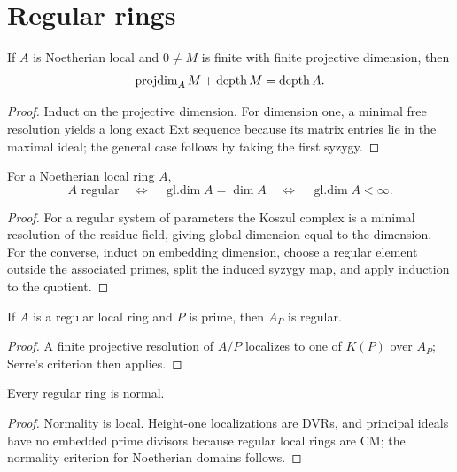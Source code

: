 \section{Regular rings}
\begin{theorem}\label{mcrt-thm-19-1}
If $A$ is Noetherian local and $0\ne M$ is finite with finite projective
dimension, then
\[
\operatorname{projdim}_A M+\operatorname{depth} M=\operatorname{depth} A.
\]
\end{theorem}
\begin{proof}
Induct on the projective dimension.  For dimension one, a minimal free
resolution yields a long exact Ext sequence because its matrix entries lie in
the maximal ideal; the general case follows by taking the first syzygy.
\end{proof}

\begin{theorem}\label{mcrt-thm-19-2}
For a Noetherian local ring $A$,
\[
A\text{ regular}\quad\Longleftrightarrow\quad
\operatorname{gl.dim}A=\dim A\quad\Longleftrightarrow\quad
\operatorname{gl.dim}A<\infty.
\]
\end{theorem}
\begin{proof}
For a regular system of parameters the Koszul complex is a minimal resolution
of the residue field, giving global dimension equal to the dimension.  For the
converse, induct on embedding dimension, choose a regular element outside the
associated primes, split the induced syzygy map, and apply induction to the
quotient.
\end{proof}

\begin{theorem}\label{mcrt-thm-19-3}
If $A$ is a regular local ring and $P$ is prime, then $A_P$ is regular.
\end{theorem}
\begin{proof}
A finite projective resolution of $A/P$ localizes to one of $K(P)$ over $A_P$;
Serre's criterion then applies.
\end{proof}

\begin{theorem}\label{mcrt-thm-19-4}
Every regular ring is normal.
\end{theorem}
\begin{proof}
Normality is local.  Height-one localizations are DVRs, and principal ideals
have no embedded prime divisors because regular local rings are CM; the normality
criterion for Noetherian domains follows.
\end{proof}

